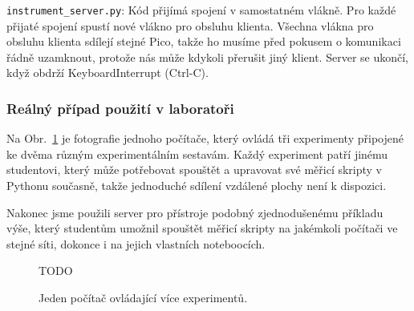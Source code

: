 \verb|instrument_server.py|:
Kód přijímá spojení v samostatném vlákně. Pro každé přijaté spojení spustí nové vlákno pro obsluhu klienta. Všechna vlákna pro obsluhu klienta sdílejí stejné Pico, takže ho musíme před pokusem o komunikaci řádně uzamknout, protože nás může kdykoli přerušit jiný klient. Server se ukončí, když obdrží KeyboardInterrupt (Ctrl-C).

\subsubsection{Reálný případ použití v laboratoři}
Na Obr.~\ref{fig:networking-usecase} je fotografie jednoho počítače, který ovládá tři experimenty připojené ke dvěma různým experimentálním sestavám. Každý experiment patří jinému studentovi, který může potřebovat spouštět a upravovat své měřicí skripty v Pythonu současně, takže jednoduché sdílení vzdálené plochy není k dispozici.

Nakonec jsme použili server pro přístroje podobný zjednodušenému příkladu výše, který studentům umožnil spouštět měřicí skripty na jakémkoli počítači ve stejné síti, dokonce i na jejich vlastních noteboocích.

\begin{figure}
    \label{fig:networking-usecase}
    TODO
    \caption{Jeden počítač ovládající více experimentů.}
\end{figure}